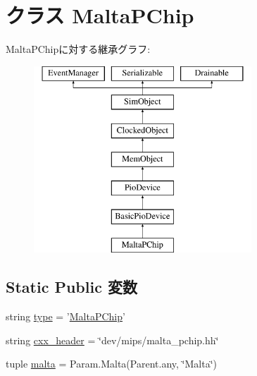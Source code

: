 \hypertarget{classMalta_1_1MaltaPChip}{
\section{クラス MaltaPChip}
\label{classMalta_1_1MaltaPChip}
}
MaltaPChipに対する継承グラフ:\begin{figure}[H]
\begin{center}
\leavevmode
\includegraphics[height=7cm]{classMalta_1_1MaltaPChip}
\end{center}
\end{figure}
\subsection*{Static Public 変数}
\begin{DoxyCompactItemize}
\item 
string \hyperlink{classMalta_1_1MaltaPChip_acce15679d830831b0bbe8ebc2a60b2ca}{type} = '\hyperlink{classMalta_1_1MaltaPChip}{MaltaPChip}'
\item 
string \hyperlink{classMalta_1_1MaltaPChip_a17da7064bc5c518791f0c891eff05fda}{cxx\_\-header} = \char`\"{}dev/mips/malta\_\-pchip.hh\char`\"{}
\item 
tuple \hyperlink{classMalta_1_1MaltaPChip_ae688b1cb082350c971cc4aaf26b66104}{malta} = Param.Malta(Parent.any, \char`\"{}Malta\char`\"{})
\end{DoxyCompactItemize}



